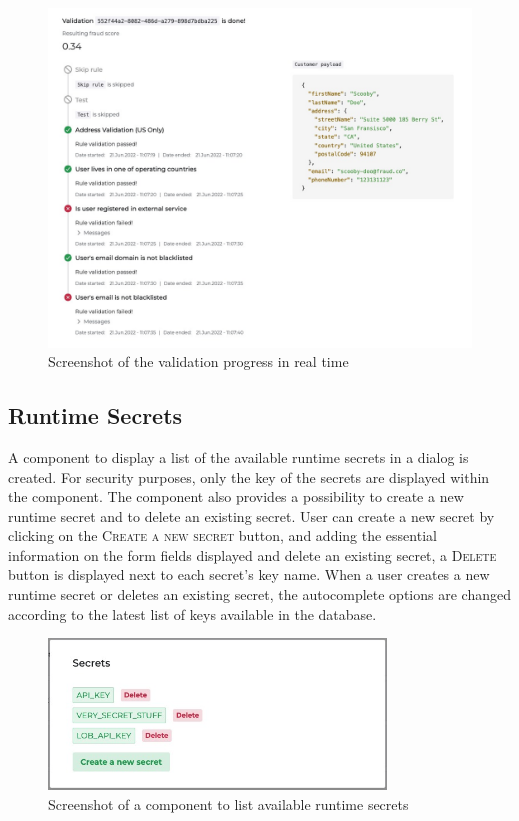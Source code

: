     \begin{figure}[!ht]
      \includegraphics[width=\textwidth]{images/ss_validation_progress.jpeg}
      \caption{Screenshot of the validation progress in real time}
    \end{figure}
  
  \subsection{Runtime Secrets}

    A component to display a list of the available runtime secrets in a dialog is created. For security purposes, only the key of the secrets are displayed within the component. The component also provides a possibility to create a new runtime secret and to delete an existing secret. User can create a new secret by clicking on the \textsc{Create a new secret} button, and adding the essential information on the form fields displayed and delete an existing secret, a \textsc{Delete} button is displayed next to each secret's key name. When a user creates a new runtime secret or deletes an existing secret, the autocomplete options are changed according to the latest list of keys available in the database.

    \begin{figure}[!ht]
      \centering
      \includegraphics[width=0.8\textwidth]{images/ss_secrets.jpeg}
      \caption{Screenshot of a component to list available runtime secrets}
    \end{figure}
    
    
    